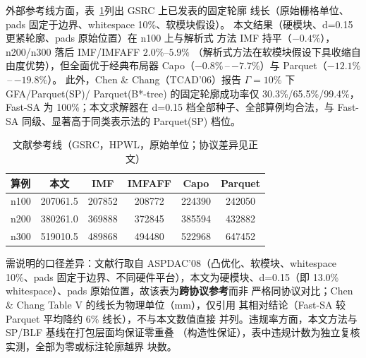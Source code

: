 外部参考线方面，表~\ref{tab:literature}列出 GSRC 上已发表的固定轮廓
线长（原始栅格单位、pads 固定于边界、whitespace 10\%、软模块假设）。
本文结果（硬模块、d=0.15 更紧轮廓、pads 原始位置）在 n100 上与解析式
方法 IMF 持平（$-0.4\%$），n200/n300 落后 IMF/IMFAFF $2.0\%$--$5.9\%$
（解析式方法在软模块假设下具收缩自由度优势），但全面优于经典布局器
Capo（$-0.8\%$\,--\,$-7.7\%$）与 Parquet（$-12.1\%$\,--\,$-19.8\%$）。
此外，Chen \& Chang（TCAD'06）报告 $\Gamma=10\%$ 下 GFA/Parquet(SP)/
Parquet(B*-tree) 的固定轮廓成功率仅 30.3\%/65.5\%/99.4\%，Fast-SA 为
100\%；本文求解器在 d=0.15 档全部种子、全部算例均合法，与 Fast-SA
同级、显著高于同类表示法的 Parquet(SP) 档位。

\begin{table}[H]
	\centering
	\caption{文献参考线（GSRC，HPWL，原始单位；协议差异见正文）}
	\label{tab:literature}
	\scriptsize
	\renewcommand{\arraystretch}{0.9}
	\begin{tabular*}{\linewidth}{@{\extracolsep{\fill}}lccccc}
		\toprule
		算例 & 本文 & IMF & IMFAFF & Capo & Parquet \\
		\midrule
		n100 & 207061.5 & 207852 & 208772 & 224390 & 242050 \\
		n200 & 380261.0 & 369888 & 372845 & 385594 & 432882 \\
		n300 & 519010.5 & 489868 & 494480 & 522968 & 647452 \\
		\bottomrule
	\end{tabular*}
\end{table}

需说明的口径差异：文献行取自 ASPDAC'08（凸优化、软模块、whitespace
10\%、pads 固定于边界、不同硬件平台），本文为硬模块、d=0.15（即
13.0\% whitespace）、pads 原始位置，故该表为\textbf{跨协议参考}而非
严格同协议对比；Chen \& Chang Table V 的线长为物理单位（mm），仅引用
其相对结论（Fast-SA 较 Parquet 平均降约 6\% 线长），不与本文数值直接
并列。违规率方面，本文方法与 SP/BLF 基线在打包层面均保证零重叠
（构造性保证），表中违规计数为独立复核实测，全部为零或标注轮廓越界
块数。
